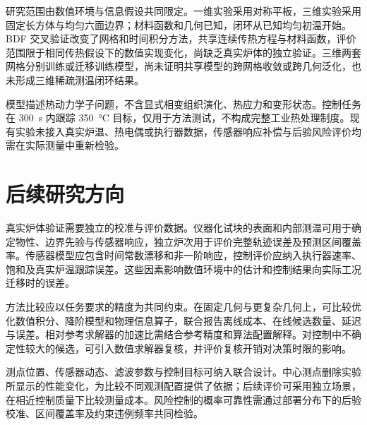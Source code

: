 研究范围由数值环境与信息假设共同限定。一维实验采用对称平板，三维实验采用固定长方体与均匀六面边界；材料函数和几何已知，闭环从已知均匀初温开始。BDF 交叉验证改变了网格和时间积分方法，共享连续传热方程与材料函数，评价范围限于相同传热假设下的数值实现变化，尚缺乏真实炉体的独立验证。三维两套网格分别训练或迁移训练模型，尚未证明共享模型的跨网格收敛或跨几何泛化，也未形成三维稀疏测温闭环结果。

模型描述热动力学子问题，不含显式相变组织演化、热应力和变形状态。控制任务在 \SI{300}{\second} 内跟踪 \SI{350}{\degreeCelsius} 目标，仅用于方法测试，不构成完整工业热处理制度。现有实验未接入真实炉温、热电偶或执行器数据，传感器响应补偿与后验风险评价均需在实际测量中重新检验。

\section{后续研究方向}

真实炉体验证需要独立的校准与评价数据。仪器化试块的表面和内部测温可用于确定物性、边界先验与传感器响应，独立炉次用于评价完整轨迹误差及预测区间覆盖率。传感器模型应包含时间常数漂移和非一阶响应，控制评价应纳入执行器速率、饱和及真实炉温跟踪误差。这些因素影响数值环境中的估计和控制结果向实际工况迁移时的误差。

方法比较应以任务要求的精度为共同约束。在固定几何与更复杂几何上，可比较优化数值积分、降阶模型和物理信息算子\cite{wang2021pideeponet,derouiche2021induction,gong2026heatrom}，联合报告离线成本、在线候选数量、延迟与误差。相对参考求解器的加速比需结合参考精度和算法配置解释。对控制中不确定性较大的候选，可引入数值求解器复核，并评价复核开销对决策时限的影响。

测点位置、传感器动态、滤波参数与控制目标可纳入联合设计。中心测点删除实验所显示的性能变化，为比较不同观测配置提供了依据；后续评价可采用独立场景，在相近控制质量下比较测量成本。风险控制的概率可靠性需通过部署分布下的后验校准、区间覆盖率及约束违例频率共同检验。

